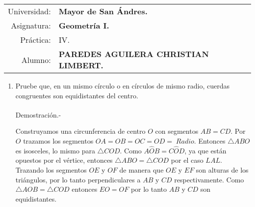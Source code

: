 \documentclass[10pt]{article}
\begin{document}
\begin{tabular}{r l }
Universidad: & \textbf{Mayor de San Ándres.}\\
Asignatura: & \textbf{Geometría I.}\\
 Práctica: & IV.\\ Alumno: & \textbf{PAREDES AGUILERA CHRISTIAN LIMBERT.}
\end{tabular}
\begin{flushleft}
\end{flushleft}


\begin{enumerate}
    
\item Pruebe que, en un mismo círculo o en círculos de mismo radio, cuerdas congruentes son equidistantes del centro.\\\\
    Demostración.-\;
    \begin{center}
    \end{center}
    Construyamos una circunferencia de centro $O$ con segmentos  $AB = CD$. Por $O$ trazamos los segmentos $OA = OB = OC = OD = \; Radio$. Entonces $\triangle ABO$ es isosceles, lo mismo para $\triangle COD$. Como $A\widehat{O}B = C\widehat{O}D$, ya que están opuestos por el vértice, entonces $\triangle ABO = \triangle COD$ por el caso $LAL$. Trazando los segmentos $OE$ y $OF$ de manera que $OE$ y $EF$ son alturas de los triángulos, por lo tanto perpendiculares a $AB$ y $CD$ respectivamente. Como $\triangle AOB = \triangle COD$ entonces $EO = OF$ por lo tanto $AB$ y $CD$ son equidistantes.\\\\


\end{enumerate}
\end{document}
